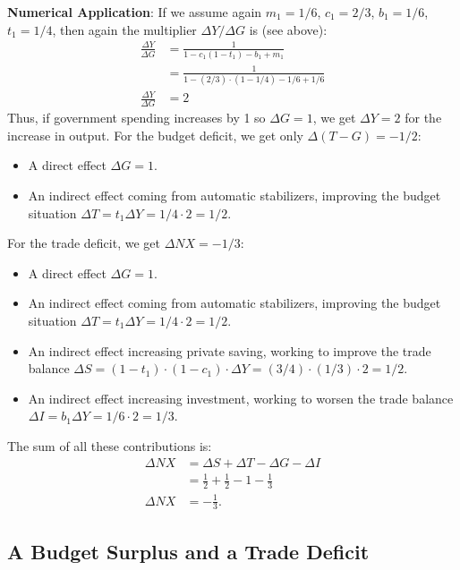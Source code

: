 \documentclass[]{book}
\providecommand{\tightlist}{%
  \setlength{\itemsep}{0pt}\setlength{\parskip}{0pt}}
\begin{document}
\textbf{Numerical Application}: If we assume again \(m_1=1/6\),
\(c_1=2/3\), \(b_1=1/6\), \(t_1=1/4\), then again the multiplier
\(\Delta Y/\Delta G\) is (see above): \[
\begin{aligned}
\frac{\Delta Y}{\Delta G}&=\frac{1}{1-c_1(1-t_1)-b_1+m_1}\\
&=\frac{1}{1-(2/3) \cdot (1- 1/4)-1/6+1/6}\\
\frac{\Delta Y}{\Delta G}&=2
\end{aligned}
\] Thus, if government spending increases by 1 so \(\Delta G = 1\), we
get \(\Delta Y=2\) for the increase in output. For the budget deficit,
we get only \(\Delta(T-G)=-1/2\):

\begin{itemize}
\tightlist
\item
  A direct effect \(\Delta G=1\).
\item
  An indirect effect coming from automatic stabilizers, improving the
  budget situation \(\Delta T = t_1 \Delta Y =1/4\cdot2=1/2\).
\end{itemize}

For the trade deficit, we get \(\Delta NX = -1/3\):

\begin{itemize}
\tightlist
\item
  A direct effect \(\Delta G=1\).
\item
  An indirect effect coming from automatic stabilizers, improving the
  budget situation \(\Delta T = t_1 \Delta Y =1/4\cdot2=1/2\).
\item
  An indirect effect increasing private saving, working to improve the
  trade balance
  \(\Delta S = (1-t_1)\cdot(1-c_1)\cdot\Delta Y=(3/4)\cdot( 1/3) \cdot 2=1/2\).
\item
  An indirect effect increasing investment, working to worsen the trade
  balance \(\Delta I = b_1 \Delta Y = 1/6\cdot 2 = 1/3\).
\end{itemize}

The sum of all these contributions is: \[
\begin{aligned}
\Delta NX&=\Delta S + \Delta T-\Delta G-\Delta I\\
&=\frac{1}{2}+\frac{1}{2}-1-\frac{1}{3}\\
\Delta NX&=-\frac{1}{3}.
\end{aligned}
\]

\subsection{A Budget Surplus and a Trade
Deficit}\label{a-budget-surplus-and-a-trade-deficit}
\end{document}
